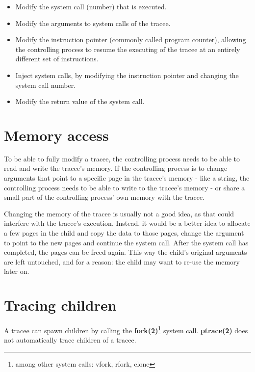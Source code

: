 \documentclass[a4paper, 10pt]{report}
\begin{document}
\begin{itemize}
\item Modify the system call (number) that is executed.
\item Modify the arguments to system calls of the tracee.
\item Modify the instruction pointer (commonly called program counter), allowing
    the controlling process to resume the executing of the tracee at an entirely
    different set of instructions.
\item Inject system calls, by modifying the instruction pointer and changing the
    system call number.
\item Modify the return value of the system call.
\end{itemize}

\section{Memory access}

To be able to fully modify a tracee, the controlling process needs to be able to
read and write the tracee's memory. If the controlling process is to change
arguments that point to a specific page in the tracee's memory - like a string,
the controlling process needs to be able to write to the tracee's memory - or
share a small part of the controlling process' own memory with the tracee.

Changing the memory of the tracee is usually not a good idea, as that could
interfere with the tracee's execution.
Instead, it would be a better idea to allocate a few pages in the
child and copy the data to those pages, change the argument to point to the new
pages and continue the system call. After the system call has completed, the
pages can be freed again. This way the child's original arguments are left
untouched, and for a reason: the child may want to re-use the memory later on.


\section{Tracing children}

A tracee can spawn children by calling the \textbf{fork(2)}\footnote{among
    other system calls: vfork, rfork, clone} system call. \textbf{ptrace(2)}
does not automatically trace children of a tracee.
\end{document}
